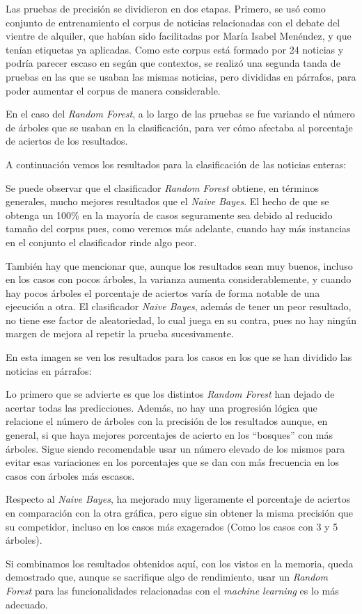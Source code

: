 Las pruebas de precisión se dividieron en dos etapas. Primero, se usó como conjunto de entrenamiento el corpus de noticias relacionadas con el debate del vientre de alquiler, que habían sido facilitadas por María Isabel Menéndez, y que tenían etiquetas ya aplicadas. Como este corpus está formado por 24 noticias y podría parecer escaso en según que contextos, se realizó una segunda tanda de pruebas en las que se usaban las mismas noticias, pero divididas en párrafos, para poder aumentar el corpus de manera considerable.

En el caso del \emph{Random Forest}, a lo largo de las pruebas se fue variando el número de árboles que se usaban en la clasificación, para ver cómo afectaba al porcentaje de aciertos de los resultados. 

A continuación vemos los resultados para la clasificación de las noticias enteras:


Se puede observar que el clasificador \emph{Random Forest} obtiene, en términos generales, mucho mejores resultados que el \emph{Naive Bayes}. El hecho de que se obtenga un 100\% en la mayoría de casos seguramente sea debido al reducido tamaño del corpus pues, como veremos más adelante, cuando hay más instancias en el conjunto el clasificador rinde algo peor.

También hay que mencionar que, aunque los resultados sean muy buenos, incluso en los casos con pocos árboles, la varianza aumenta considerablemente, y cuando hay pocos árboles el porcentaje de aciertos varía de forma notable de una ejecución a otra. El clasificador \emph{Naive Bayes}, además de tener un peor resultado, no tiene ese factor de aleatoriedad, lo cual juega en su contra, pues no hay ningún margen de mejora al repetir la prueba sucesivamente.

En esta imagen se ven los resultados para los casos en los que se han dividido las noticias en párrafos:


Lo primero que se advierte es que los distintos \emph{Random Forest} han dejado de acertar todas las predicciones. Además, no hay una progresión lógica que relacione el número de árboles con la precisión de los resultados aunque, en general, si que haya mejores porcentajes de acierto en los ``bosques'' con más árboles. Sigue siendo recomendable usar un número elevado de los mismos para evitar esas variaciones en los porcentajes que se dan con más frecuencia en los casos con árboles más escasos.

Respecto al \emph{Naive Bayes}, ha mejorado muy ligeramente el porcentaje de aciertos en comparación con la otra gráfica, pero sigue sin obtener la misma precisión que su competidor, incluso en los casos más exagerados (Como los casos con 3 y 5 árboles).

Si combinamos los resultados obtenidos aquí, con los vistos en la memoria, queda demostrado que, aunque se sacrifique algo de rendimiento, usar un \emph{Random Forest} para las funcionalidades relacionadas con el \emph{machine learning} es lo más adecuado.